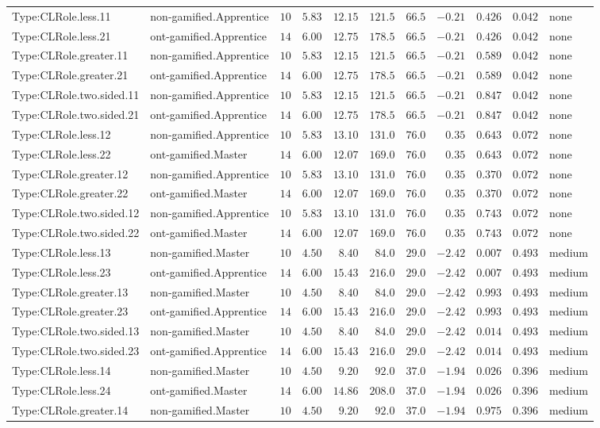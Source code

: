 \documentclass[6pt,a4paper]{article}
\begin{document}
{\begin{longtable}{llrrrrrrrrl}
Type:CLRole.less.11&non-gamified.Apprentice&$10$&$5.83$&$12.15$&$121.5$&$ 66.5$&$-0.21$&$0.426$&$0.042$&none\tabularnewline
Type:CLRole.less.21&ont-gamified.Apprentice&$14$&$6.00$&$12.75$&$178.5$&$ 66.5$&$-0.21$&$0.426$&$0.042$&none\tabularnewline
Type:CLRole.greater.11&non-gamified.Apprentice&$10$&$5.83$&$12.15$&$121.5$&$ 66.5$&$-0.21$&$0.589$&$0.042$&none\tabularnewline
Type:CLRole.greater.21&ont-gamified.Apprentice&$14$&$6.00$&$12.75$&$178.5$&$ 66.5$&$-0.21$&$0.589$&$0.042$&none\tabularnewline
Type:CLRole.two.sided.11&non-gamified.Apprentice&$10$&$5.83$&$12.15$&$121.5$&$ 66.5$&$-0.21$&$0.847$&$0.042$&none\tabularnewline
Type:CLRole.two.sided.21&ont-gamified.Apprentice&$14$&$6.00$&$12.75$&$178.5$&$ 66.5$&$-0.21$&$0.847$&$0.042$&none\tabularnewline
Type:CLRole.less.12&non-gamified.Apprentice&$10$&$5.83$&$13.10$&$131.0$&$ 76.0$&$ 0.35$&$0.643$&$0.072$&none\tabularnewline
Type:CLRole.less.22&ont-gamified.Master&$14$&$6.00$&$12.07$&$169.0$&$ 76.0$&$ 0.35$&$0.643$&$0.072$&none\tabularnewline
Type:CLRole.greater.12&non-gamified.Apprentice&$10$&$5.83$&$13.10$&$131.0$&$ 76.0$&$ 0.35$&$0.370$&$0.072$&none\tabularnewline
Type:CLRole.greater.22&ont-gamified.Master&$14$&$6.00$&$12.07$&$169.0$&$ 76.0$&$ 0.35$&$0.370$&$0.072$&none\tabularnewline
Type:CLRole.two.sided.12&non-gamified.Apprentice&$10$&$5.83$&$13.10$&$131.0$&$ 76.0$&$ 0.35$&$0.743$&$0.072$&none\tabularnewline
Type:CLRole.two.sided.22&ont-gamified.Master&$14$&$6.00$&$12.07$&$169.0$&$ 76.0$&$ 0.35$&$0.743$&$0.072$&none\tabularnewline
Type:CLRole.less.13&non-gamified.Master&$10$&$4.50$&$ 8.40$&$ 84.0$&$ 29.0$&$-2.42$&$0.007$&$0.493$&medium\tabularnewline
Type:CLRole.less.23&ont-gamified.Apprentice&$14$&$6.00$&$15.43$&$216.0$&$ 29.0$&$-2.42$&$0.007$&$0.493$&medium\tabularnewline
Type:CLRole.greater.13&non-gamified.Master&$10$&$4.50$&$ 8.40$&$ 84.0$&$ 29.0$&$-2.42$&$0.993$&$0.493$&medium\tabularnewline
Type:CLRole.greater.23&ont-gamified.Apprentice&$14$&$6.00$&$15.43$&$216.0$&$ 29.0$&$-2.42$&$0.993$&$0.493$&medium\tabularnewline
Type:CLRole.two.sided.13&non-gamified.Master&$10$&$4.50$&$ 8.40$&$ 84.0$&$ 29.0$&$-2.42$&$0.014$&$0.493$&medium\tabularnewline
Type:CLRole.two.sided.23&ont-gamified.Apprentice&$14$&$6.00$&$15.43$&$216.0$&$ 29.0$&$-2.42$&$0.014$&$0.493$&medium\tabularnewline
Type:CLRole.less.14&non-gamified.Master&$10$&$4.50$&$ 9.20$&$ 92.0$&$ 37.0$&$-1.94$&$0.026$&$0.396$&medium\tabularnewline
Type:CLRole.less.24&ont-gamified.Master&$14$&$6.00$&$14.86$&$208.0$&$ 37.0$&$-1.94$&$0.026$&$0.396$&medium\tabularnewline
Type:CLRole.greater.14&non-gamified.Master&$10$&$4.50$&$ 9.20$&$ 92.0$&$ 37.0$&$-1.94$&$0.975$&$0.396$&medium\tabularnewline

\end{longtable}}
\end{document}

